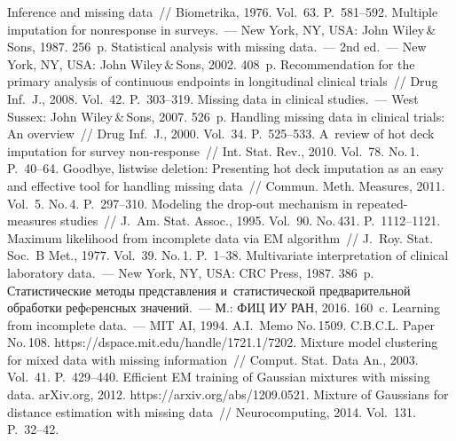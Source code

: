 \begin{multicols}{2}
{\small\frenchspacing
 {%
 \begin{thebibliography}{99}
 Inference and missing data~// Biometrika, 1976. Vol.~63.  
P.~581--592. 
 Multiple imputation for nonresponse in surveys.~--- New York, 
NY, USA: John Wiley\,\&\,Sons, 1987. 256~p.
 Statistical analysis with missing data.~--- 2nd 
ed.~--- New York, NY, USA: John Wiley\,\&\,Sons, 2002. 408~p.
Recommendation for the primary analysis of continuous endpoints in longitudinal 
clinical trials~// Drug Inf.~J., 2008. Vol.~42. P.~303--319.
 Missing data in clinical studies.~--- West 
Sussex: John Wiley\,\&\,Sons, 2007. 526~p.
 Handling missing data in clinical trials: An overview~// Drug 
Inf.~J., 2000. Vol.~34. P.~525--533.
 A~review of hot deck imputation for survey 
non-response~// Int. Stat. Rev., 2010. Vol.~78. No.\,1. P.~40--64.
 Goodbye, listwise deletion: Presenting hot deck imputation as an 
easy and effective tool for handling missing data~// Commun. Meth.  
Measures, 2011. Vol.~5. No.\,4. P.~297--310.
 Modeling the drop-out mechanism in repeated-measures 
studies~// J.~Am. Stat. Assoc., 1995. Vol.~90. No.\,431.  
P.~1112--1121.
 Maximum likelihood from 
incomplete data via EM algorithm~// J.~Roy. Stat. Soc.~B Met., 
1977. Vol.~39. No.\,1. P.~1--38.
 Multivariate interpretation of clinical laboratory data.~--- New York, 
NY, USA: CRC Press, 1987. 386~p.
 Статистические методы представления и~статистической 
предварительной обработки рефeренсных значений.~--- М.: ФИЦ ИУ РАН, 
2016. 160~c.
 Learning from incomplete data.~--- 
MIT AI, 1994.  A.I.\ 
Memo No.\,1509. C.B.C.L. Paper No.\,108. {\sf 
https://dspace.mit.edu/\linebreak handle/1721.1/7202}.
 Mixture model clustering for mixed data with missing 
information~// Comput. Stat. Data An., 2003. Vol.~41. P.~429--440.
\bibitem{16-kri}
 Efficient EM training of Gaussian 
mixtures with missing data. arXiv.org, 2012. {\sf https://arxiv.org/abs/1209.0521}.
\bibitem{17-kri}
 Mixture of Gaussians for 
distance estimation with missing data~// Neurocomputing, 2014. Vol.~131.  
P.~32--42.
 \end{thebibliography}

 }
 }

\end{multicols}


